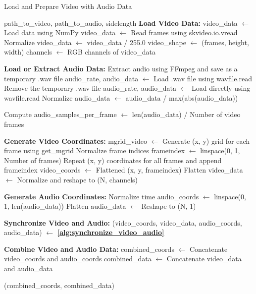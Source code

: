 \documentclass{ioereport}
\begin{document}
\begin{algorithm}
    \caption{Load and Prepare Video with Audio Data}
    \label{alg:load_video_audio}
    \begin{algorithmic}[1]
    \REQUIRE path\_to\_video, path\_to\_audio, sidelength
    \STATE \textbf{Load Video Data:}
        \STATE video\_data $\gets$ Load data using NumPy
        \STATE video\_data $\gets$ Read frames using skvideo.io.vread
        \STATE Normalize video\_data $\gets$ video\_data / 255.0
    \ENDIF
    \STATE video\_shape $\gets$ (frames, height, width)
    \STATE channels $\gets$ RGB channels of video\_data
    
    \STATE \textbf{Load or Extract Audio Data:}
        \STATE Extract audio using FFmpeg and save as a temporary .wav file
        \STATE audio\_rate, audio\_data $\gets$ Load .wav file using wavfile.read
        \STATE Remove the temporary .wav file
    \ELSE
        \STATE audio\_rate, audio\_data $\gets$ Load directly using wavfile.read
    \ENDIF
    \STATE Normalize audio\_data $\gets$ audio\_data / max(abs(audio\_data))
    
    \STATE Compute audio\_samples\_per\_frame $\gets$ len(audio\_data) / Number of video frames
    
    \STATE \textbf{Generate Video Coordinates:}
    \STATE mgrid\_video $\gets$ Generate (x, y) grid for each frame using get\_mgrid
    \STATE Normalize frame indices frameindex $\gets$ linspace(0, 1, Number of frames)
    \STATE Repeat (x, y) coordinates for all frames and append frameindex
    \STATE video\_coords $\gets$ Flattened (x, y, frameindex)
    \STATE Flatten video\_data $\gets$ Normalize and reshape to (N, channels)
    
    \STATE \textbf{Generate Audio Coordinates:}
    \STATE Normalize time audio\_coords $\gets$ linspace(0, 1, len(audio\_data))
    \STATE Flatten audio\_data $\gets$ Reshape to (N, 1)
    
    \STATE \textbf{Synchronize Video and Audio:}
    \STATE (video\_coords, video\_data, audio\_coords, audio\_data) $\gets$ \textbf{\autoref{alg:synchronize_video_audio}}
    
    \STATE \textbf{Combine Video and Audio Data:}
    \STATE combined\_coords $\gets$ Concatenate video\_coords and audio\_coords
    \STATE combined\_data $\gets$ Concatenate video\_data and audio\_data
    
    \RETURN (combined\_coords, combined\_data)
    \end{algorithmic}
\end{algorithm}
\end{document}

